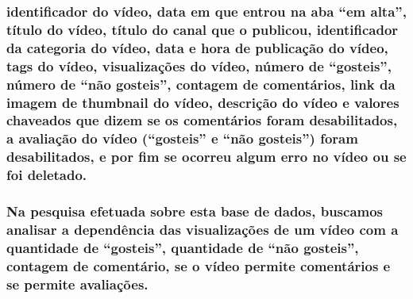\documentclass[]{article}
\begin{document}
\hypertarget{identificador-do-video-data-em-que-entrou-na-aba-em-alta-titulo-do-video-titulo-do-canal-que-o-publicou-identificador-da-categoria-do-video-data-e-hora-de-publicacao-do-video-tags-do-video-visualizacoes-do-video-numero-de-gosteis-numero-de-nao-gosteis-contagem-de-comentarios-link-da-imagem-de-thumbnail-do-video-descricao-do-video-e-valores-chaveados-que-dizem-se-os-comentarios-foram-desabilitados-a-avaliacao-do-video-gosteis-e-nao-gosteis-foram-desabilitados-e-por-fim-se-ocorreu-algum-erro-no-video-ou-se-foi-deletado.}{%
\subsubsection{identificador do vídeo, data em que entrou na aba ``em
alta'', título do vídeo, título do canal que o publicou, identificador
da categoria do vídeo, data e hora de publicação do vídeo, tags do
vídeo, visualizações do vídeo, número de ``gosteis'', número de ``não
gosteis'', contagem de comentários, link da imagem de thumbnail do
vídeo, descrição do vídeo e valores chaveados que dizem se os
comentários foram desabilitados, a avaliação do vídeo (``gosteis'' e
``não gosteis'') foram desabilitados, e por fim se ocorreu algum erro no
vídeo ou se foi
deletado.}\label{identificador-do-video-data-em-que-entrou-na-aba-em-alta-titulo-do-video-titulo-do-canal-que-o-publicou-identificador-da-categoria-do-video-data-e-hora-de-publicacao-do-video-tags-do-video-visualizacoes-do-video-numero-de-gosteis-numero-de-nao-gosteis-contagem-de-comentarios-link-da-imagem-de-thumbnail-do-video-descricao-do-video-e-valores-chaveados-que-dizem-se-os-comentarios-foram-desabilitados-a-avaliacao-do-video-gosteis-e-nao-gosteis-foram-desabilitados-e-por-fim-se-ocorreu-algum-erro-no-video-ou-se-foi-deletado.}}

\hypertarget{na-pesquisa-efetuada-sobre-esta-base-de-dados-buscamos-analisar-a-dependencia-das-visualizacoes-de-um-video-com-a-quantidade-de-gosteis-quantidade-de-nao-gosteis-contagem-de-comentario-se-o-video-permite-comentarios-e-se-permite-avaliacoes.}{%
\subsubsection{Na pesquisa efetuada sobre esta base de dados, buscamos
analisar a dependência das visualizações de um vídeo com a quantidade de
``gosteis'', quantidade de ``não gosteis'', contagem de comentário, se o
vídeo permite comentários e se permite
avaliações.}\label{na-pesquisa-efetuada-sobre-esta-base-de-dados-buscamos-analisar-a-dependencia-das-visualizacoes-de-um-video-com-a-quantidade-de-gosteis-quantidade-de-nao-gosteis-contagem-de-comentario-se-o-video-permite-comentarios-e-se-permite-avaliacoes.}}
\end{document}
